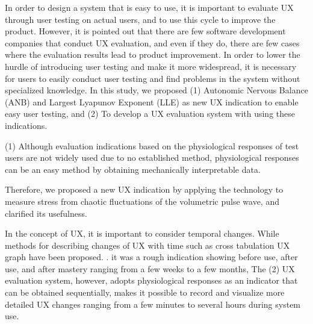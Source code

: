 \begin{eabstract}

In order to design a system that is easy to use, it is important to evaluate UX through user testing on actual users, and to use this cycle to improve the product. However, it is pointed out that there are few software development companies that conduct UX evaluation, and even if they do, there are few cases where the evaluation results lead to product improvement. In order to lower the hurdle of introducing user testing and make it more widespread, it is necessary for users to easily conduct user testing and find problems in the system without specialized knowledge. In this study, we proposed (1) Autonomic Nervous Balance (ANB) and Largest Lyapunov Exponent (LLE) as new UX indication to enable easy user testing, and  (2) To develop a UX evaluation system with using these indications.

(1) Although evaluation indications based on the physiological responses of test users are not widely used due to no established method, physiological responses can be an easy method by obtaining mechanically interpretable data. 

Therefore, we proposed a new UX indication by applying the technology to measure stress from chaotic fluctuations of the volumetric pulse wave, and clarified its usefulness.

In the concept of UX, it is important to consider temporal changes. While methods for describing changes of UX with time such as cross tabulation UX graph have been proposed. . it was a rough indication showing before use, after use, and after mastery ranging from a few weeks to a few months,  The (2) UX evaluation system, however, adopts physiological responses as an indicator that can be obtained sequentially, makes it possible to record and visualize more detailed UX changes ranging from a few minutes to several hours during system use.


\end{eabstract}
